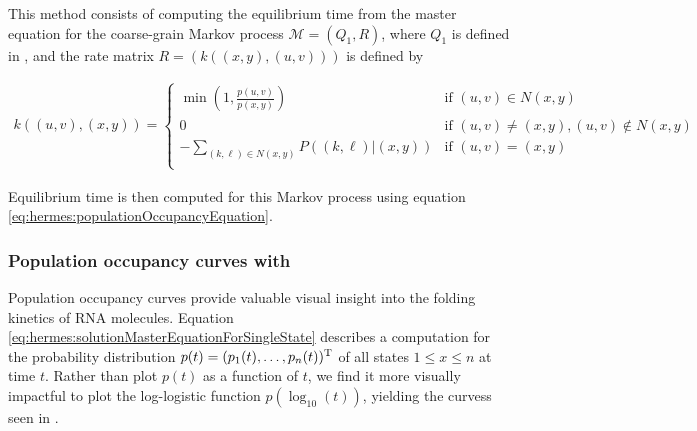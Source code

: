 This method consists of computing the equilibrium time
from the master equation for the coarse-grain Markov process
$\mathcal{M}=(Q_1,R)$, where $Q_1$ is defined in
, and the rate matrix
$R = (k((x,y),(u,v)))$ is defined by

\begin{align}
\label{eq:hermes:xitionRateFfttwoWithoutHastings}
k((u,v),(x,y))=
\begin{cases}
\min\left(1, \frac{p(u,v)}{p(x,y)}\right) & \text{if $(u,v) \in N(x,y)$} \\
0 &\text{if $(u,v) \ne (x,y), (u,v) \not\in N(x,y)$} \\
- \sum_{(k,\ell) \in N(x,y)} P((k,\ell)|(x,y)) & \text{if $(u,v)=(x,y)$} \\
\end{cases}
\end{align}

Equilibrium time is then computed for this Markov process using
equation \ref{eq:hermes:populationOccupancyEquation}.

\subsubsection{Population occupancy curves with \ffteq}
\label{subsubsec:hermes:popcurve}

Population occupancy curves provide valuable visual insight into the folding
kinetics of RNA molecules.
Equation \ref{eq:hermes:solutionMasterEquationForSingleState} describes a
computation for the probability distribution
$p(t)=(p_1(t),\dots,p_n(t))^{\text T}$ of all states $1 \leq x \leq n$ at
time $t$. Rather than plot $p(t)$ as a function of $t$, we find it more
visually impactful to plot the log-logistic function $p(\log_{10}(t))$,
yielding the curvess seen in .

